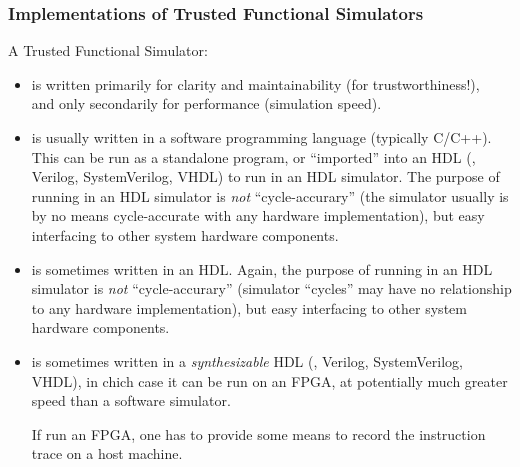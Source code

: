 \begin{frame}[fragile]
\frametitle{Implementations of Trusted Functional Simulators}

\footnotesize

A Trusted Functional Simulator:
\begin{itemize}
  \item is written primarily for clarity and maintainability (for trustworthiness!), \\
      and only secondarily for performance (simulation speed).

  \item is usually written in a software programming language
      (typically C/C++).  This can be run as a standalone program, or
      ``imported'' into an HDL ({\BSV}, Verilog, SystemVerilog, VHDL)
      to run in an HDL simulator.  The purpose of running in an HDL
      simulator is \emph{not} ``cycle-accurary'' (the simulator
      usually is by no means cycle-accurate with any hardware
      implementation), but easy interfacing to other system hardware
      components.

  \item is sometimes written in an HDL.  Again, the purpose of running
      in an HDL simulator is \emph{not} ``cycle-accurary'' (simulator
      ``cycles'' may have no relationship to any hardware
      implementation), but easy interfacing to other system hardware
      components.

  \item is sometimes written in a \emph{synthesizable} HDL ({\BSV},
      Verilog, SystemVerilog, VHDL), in chich case it can be run on an
      FPGA, at potentially much greater speed than a software
      simulator.

      If run an FPGA, one has to provide some means to record the
      instruction trace on a host machine.

\end{itemize}

\end{frame}


